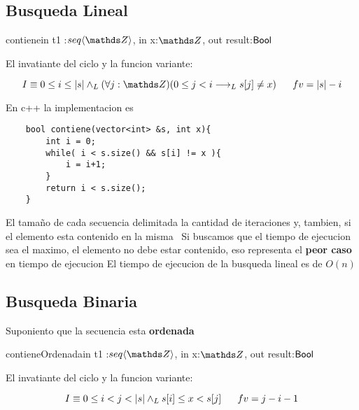 \documentclass[a4paper]{article}
\begin{document}
\subsection{Busqueda Lineal}

\begin{proc}{contiene}{in t1 :$\TLista{\ent}$, in x:$\ent$, out result:$\mathsf{Bool}$}{}
    \pre{\True}
\end{proc}

El invatiante del ciclo y la funcion variante:

\begin{equation*}
    I \equiv 0 \leq i \leq \longitud{s} \yLuego (\forall j :\ent)(0 \leq j < i \implicaLuego s[j] \neq x) \ \ \ \ \     fv = \longitud{s} - i
\end{equation*}

En c++ la implementacion es 

\begin{lstlisting}
    bool contiene(vector<int> &s, int x){
        int i = 0;
        while( i < s.size() && s[i] != x ){
            i = i+1;
        }
        return i < s.size();
    }
\end{lstlisting}

El tamaño de cada secuencia delimitada la cantidad de iteraciones y, tambien, si el elemento esta contenido en la misma \
Si buscamos que el tiempo de ejecucion sea el maximo, el elemento no debe estar contenido, eso representa el \textbf{peor caso} 
en tiempo de ejecucion
El tiempo de ejecucion de la busqueda lineal es de $O(n)$

\subsection{Busqueda Binaria}
Suponiento que la secuencia esta \textbf{ordenada}

\begin{proc}{contieneOrdenada}{in t1 :$\TLista{\ent}$, in x:$\ent$, out result:$\mathsf{Bool}$}{}
    \pre{ordenado(s)}
\end{proc}

El invatiante del ciclo y la funcion variante:

\begin{equation*}
    I \equiv 0 \leq i < j < |s| \land _L s[i] \leq x < s[j] \ \ \ \ \     fv = j - i - 1
\end{equation*}
\end{document}
